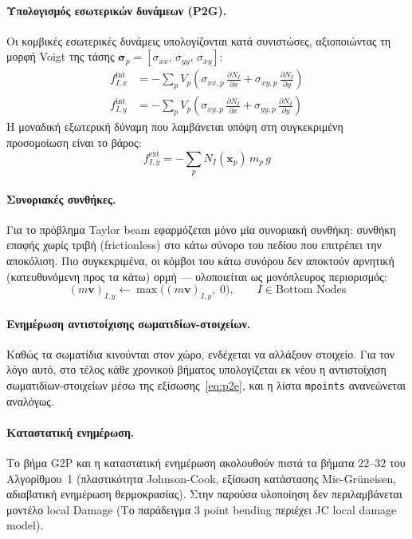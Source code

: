 \documentclass[12pt,a4paper]{report}
\begin{document}
	\paragraph{Υπολογισμός εσωτερικών δυνάμεων (P2G).}
	Οι κομβικές εσωτερικές δυνάμεις υπολογίζονται κατά συνιστώσες, αξιοποιώντας τη μορφή Voigt της τάσης $\boldsymbol{\sigma}_p = [\sigma_{xx},\,\sigma_{yy},\,\sigma_{xy}]$:
	\begin{align*}
		f_{I,x}^{\mathrm{int}} &= -\sum_p V_p \left(\sigma_{xx,p}\,\frac{\partial N_I}{\partial x} + \sigma_{xy,p}\,\frac{\partial N_I}{\partial y}\right) \\
		f_{I,y}^{\mathrm{int}} &= -\sum_p V_p \left(\sigma_{xy,p}\,\frac{\partial N_I}{\partial x} + \sigma_{yy,p}\,\frac{\partial N_I}{\partial y}\right)
	\end{align*}
	Η μοναδική εξωτερική δύναμη που λαμβάνεται υπόψη στη συγκεκριμένη προσομοίωση είναι το βάρος:
	\[
		f_{I,y}^{\mathrm{ext}} = -\sum_p N_I(\mathbf{x}_p)\,m_p\,g
	\]

	\paragraph{Συνοριακές συνθήκες.}
	Για το πρόβλημα Taylor beam εφαρμόζεται μόνο μία συνοριακή συνθήκη: συνθήκη επαφής χωρίς τριβή (frictionless) στο κάτω σύνορο του πεδίου που επιτρέπει την αποκόλιση. Πιο συγκεκριμένα, οι κόμβοι του κάτω συνόρου δεν αποκτούν αρνητική (κατευθυνόμενη προς τα κάτω) ορμή — υλοποιείται ως μονόπλευρος περιορισμός:
	\[
		(m\mathbf{v})_{I,y} \leftarrow \max\!\bigl((m\mathbf{v})_{I,y},\; 0\bigr), \qquad I \in \text{Bottom Nodes}
	\]
	
	\paragraph{Ενημέρωση αντιστοίχισης σωματιδίων-στοιχείων.}
	Καθώς τα σωματίδια κινούνται στον χώρο, ενδέχεται να αλλάξουν στοιχείο. Για τον λόγο αυτό, στο τέλος κάθε χρονικού βήματος υπολογίζεται εκ νέου η αντιστοίχιση σωματιδίων-στοιχείων μέσω της εξίσωσης~\eqref{eq:p2e}, και η λίστα \texttt{mpoints} ανανεώνεται αναλόγως.

	\paragraph{Καταστατική ενημέρωση.}
	Το βήμα G2P και η καταστατική ενημέρωση ακολουθούν πιστά τα βήματα 22–32 του Αλγορίθμου~1 (πλαστικότητα Johnson-Cook, εξίσωση κατάστασης Mie-Grüneisen, αδιαβατική ενημέρωση θερμοκρασίας). Στην παρούσα υλοποίηση δεν περιλαμβάνεται μοντέλο local Damage (Το παράδειγμα 3 point bending περιέχει JC local damage model).
\end{document}
